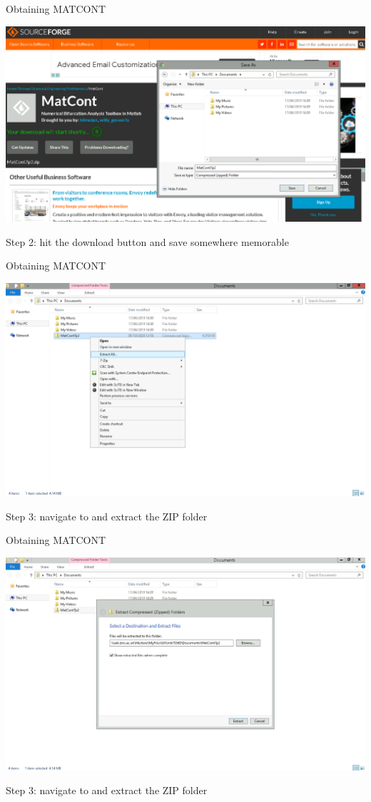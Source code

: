 \documentclass[presentation]{beamer}
\begin{document}
\begin{frame}[label={sec:orgd1ff3d8},plain]{Obtaining MATCONT}
\begin{center}
\includegraphics[width=.9\linewidth]{./MATCONT_download.png}
\end{center}

Step 2: hit the download button and save somewhere memorable
\end{frame}

\begin{frame}[label={sec:org176d356},plain]{Obtaining MATCONT}
\begin{center}
\includegraphics[width=.9\linewidth]{./MATCONT_extract.png}
\end{center}

Step 3: navigate to and extract the ZIP folder
\end{frame}
\begin{frame}[label={sec:org2fe90ce},plain]{Obtaining MATCONT}
\begin{center}
\includegraphics[width=.9\linewidth]{./MATCONT_extract2.png}
\end{center}

Step 3: navigate to and extract the ZIP folder
\end{frame}
\end{document}
